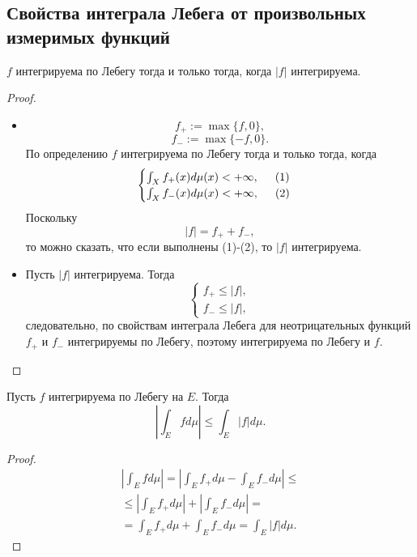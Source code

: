 \subsection{Свойства интеграла Лебега от произвольных измеримых функций}
\begin{statement}
    $f$ интегрируема по Лебегу тогда и только тогда, когда $|f|$ интегрируема.
\end{statement} 
\begin{proof}\tab
    \begin{itemize}
        \item[\underline{$\implies$}]
        \[f_+ := \max\{f,0\},\]
        \[f_- := \max\{-f,0\}.\]
        По определению $f$ интегрируема по Лебегу тогда и только тогда, когда
        \[\begin{cases}
            \int_X f_+(x) d\mu(x) < +\infty, \hspace*{.5cm} (1)\\
            \int_X f_-(x) d\mu(x) < +\infty, \hspace*{.5cm} (2)
        \end{cases}
        \]
        Поскольку
        \[|f| = f_+ + f_-,\]
        то можно сказать, что если выполнены (1)-(2), то $|f|$ интегрируема.

        \item[\underline{$\impliedby$}]
        Пусть $|f|$ интегрируема.
        Тогда
        \[
        \begin{cases}
            f_+ \leqslant |f|,\\
            f_- \leqslant |f|,
        \end{cases}
        \]
        следовательно, по свойствам интеграла Лебега для неотрицательных функций
        $f_+$ и $f_-$ интегрируемы по Лебегу, поэтому интегрируема по Лебегу и $f$.
    \end{itemize}
\end{proof} 

\begin{statement}
    Пусть $f$ интегрируема по Лебегу на $E$.
    Тогда
    \[\left|\int_E f d\mu\right| \leqslant \int_E |f| d\mu.\]
\end{statement} 
\begin{proof}
    \begin{multline*}
        \left|\int_E f d\mu\right|
        = \left|\int_E f_+ d\mu - \int_E f_- d\mu\right|
        \leqslant\\\leqslant
        \left|\int_E f_+ d\mu\right| + \left|\int_E f_- d\mu\right|
        =\\= \int_E f_+ d\mu + \int_E f_- d\mu
        = \int_E |f| d\mu.
    \end{multline*}
\end{proof} 


